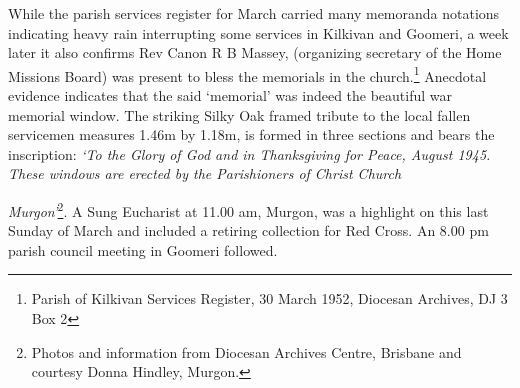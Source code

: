 While the parish services register for March carried many memoranda notations indicating heavy rain interrupting some services in Kilkivan and Goomeri, a week later it also confirms Rev Canon R B Massey, (organizing secretary of the Home Missions Board) was present to bless the memorials in the church.\footnote{Parish of Kilkivan Services Register, 30 March 1952, Diocesan Archives, DJ 3 Box 2} Anecdotal evidence indicates that the said `memorial' was indeed the beautiful war memorial window. The striking Silky Oak framed tribute to the local fallen servicemen measures 1.46m by 1.18m, is formed in three sections and bears the inscription: \emph{`To the Glory of God and in Thanksgiving for Peace, August 1945. These windows are erected by the Parishioners of Christ Church}


\emph{Murgon'}\footnote{Photos and information from Diocesan Archives Centre, Brisbane and courtesy Donna Hindley, Murgon.}. A Sung Eucharist at 11.00 am, Murgon, was a highlight on this last Sunday of March and included a retiring collection for Red Cross. An 8.00 pm parish council meeting in Goomeri followed.









